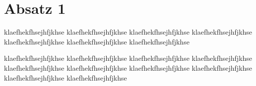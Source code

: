 \section{Absatz 1}
klaefhekfhsejhfjkhse
klaefhekfhsejhfjkhse
klaefhekfhsejhfjkhse
klaefhekfhsejhfjkhse
klaefhekfhsejhfjkhse
klaefhekfhsejhfjkhse
klaefhekfhsejhfjkhse

klaefhekfhsejhfjkhse
klaefhekfhsejhfjkhse
klaefhekfhsejhfjkhse
klaefhekfhsejhfjkhse
klaefhekfhsejhfjkhse
klaefhekfhsejhfjkhse
klaefhekfhsejhfjkhse
klaefhekfhsejhfjkhse
klaefhekfhsejhfjkhse
klaefhekfhsejhfjkhse

